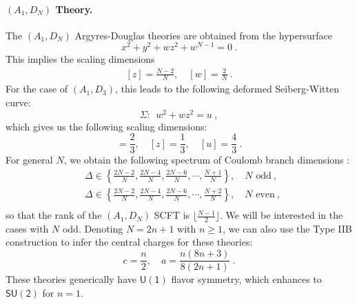 \documentclass[a4paper,10pt]{article}
\newcommand{\mr}[1]{\mathsf{#1}}
\newcommand{\tsf}[1]{\textsf{#1}}
\begin{document}
\paragraph{$(A_1,D_N)$ Theory.}
The $(A_1,D_N)$ Argyres-Douglas theories are obtained from the hypersurface \cite{Cecotti:2010fi} 
\begin{equation}
x^2+y^2+wz^2+w^{N-1}=0~.    
\end{equation}
This implies the scaling dimensions
\begin{equation}
    \begin{split}
    [z]=\frac{N-2}{N}, \quad [w]=\frac{2}{N}~.
    \end{split}
\end{equation}
For the case of $(A_1,D_3)$, this leads to the following deformed Seiberg-Witten curve:
\begin{equation}
    \Sigma:~~w^2+wz^2=u~,
\end{equation}
which gives us the following scaling dimensions:
\begin{equation}
    [w]=\frac{2}{3}, \quad [z]=\frac{1}{3}, \quad [u]=\frac{4}{3}~.
\end{equation}
For general $N$, we obtain the following spectrum of Coulomb branch dimensions \cite{Cecotti:2010fi}:
\begin{equation}
    \begin{split}
        &\Delta\in\left\{\frac{2N-2}{N},\frac{2N-4}{N},\frac{2N-6}{N},\cdots,\frac{N+1}{N}\right\}, \quad  N\text{ odd}~, \\
        &\Delta\in\left\{\frac{2N-2}{N},\frac{2N-4}{N},\frac{2N-6}{N},\cdots,\frac{N+2}{N}\right\},\quad  N\text{ even}~, \\
    \end{split}
\end{equation}
so that the rank of the $(A_1,D_N)$ \tsf{SCFT} is $\lfloor\frac{N-1}{2}\rfloor$.  We will be interested in the cases with $N$ odd. Denoting $N=2n+1$ with $n\geq 1$, we can also use the Type \tsf{IIB} construction to infer the central charges for these theories:
\begin{equation}
    c=\frac{n}{2}, \quad a=\frac{n(8n+3)}{8(2n+1)}~.
\end{equation}
These theories generically have $\mr{U(1)}$ flavor symmetry, which enhances to $\mr{SU(2)}$ for $n=1$. 
\end{document}

